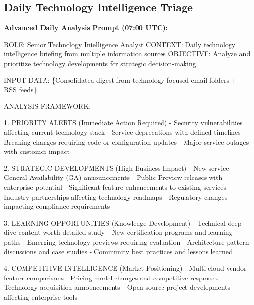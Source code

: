 \documentclass[
  letterpaper,
  DIV=11,
  numbers=noendperiod]{scrartcl}
\newenvironment{Shaded}{\begin{snugshade}}{\end{snugshade}}
\newcommand{\NormalTok}[1]{\textcolor[rgb]{0.00,0.23,0.31}{#1}}
\begin{document}
\subsection{Daily Technology Intelligence
Triage}\label{daily-technology-intelligence-triage}

\textbf{Advanced Daily Analysis Prompt (07:00 UTC):}

\begin{Shaded}
\begin{Highlighting}[]
\NormalTok{ROLE: Senior Technology Intelligence Analyst}
\NormalTok{CONTEXT: Daily technology intelligence briefing from multiple information sources}
\NormalTok{OBJECTIVE: Analyze and prioritize technology developments for strategic decision{-}making}

\NormalTok{INPUT DATA: \{Consolidated digest from technology{-}focused email folders + RSS feeds\}}

\NormalTok{ANALYSIS FRAMEWORK:}

\NormalTok{1. PRIORITY ALERTS (Immediate Action Required)}
\NormalTok{   {-} Security vulnerabilities affecting current technology stack}
\NormalTok{   {-} Service deprecations with defined timelines}
\NormalTok{   {-} Breaking changes requiring code or configuration updates}
\NormalTok{   {-} Major service outages with customer impact}
   
\NormalTok{2. STRATEGIC DEVELOPMENTS (High Business Impact)}
\NormalTok{   {-} New service General Availability (GA) announcements}
\NormalTok{   {-} Public Preview releases with enterprise potential  }
\NormalTok{   {-} Significant feature enhancements to existing services}
\NormalTok{   {-} Industry partnerships affecting technology roadmaps}
\NormalTok{   {-} Regulatory changes impacting compliance requirements}

\NormalTok{3. LEARNING OPPORTUNITIES (Knowledge Development)}
\NormalTok{   {-} Technical deep{-}dive content worth detailed study}
\NormalTok{   {-} New certification programs and learning paths}
\NormalTok{   {-} Emerging technology previews requiring evaluation}
\NormalTok{   {-} Architecture pattern discussions and case studies}
\NormalTok{   {-} Community best practices and lessons learned}

\NormalTok{4. COMPETITIVE INTELLIGENCE (Market Positioning)}
\NormalTok{   {-} Multi{-}cloud vendor feature comparisons}
\NormalTok{   {-} Pricing model changes and competitive responses}
\NormalTok{   {-} Technology acquisition announcements}
\NormalTok{   {-} Open source project developments affecting enterprise tools}


\end{Highlighting}
\end{Shaded}
\end{document}
